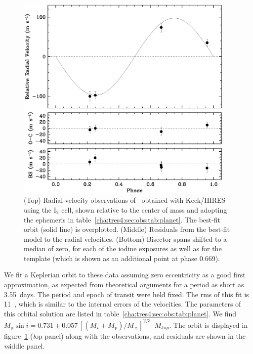 \begin{figure}
\includegraphics[width=0.95\textwidth]{A_TrES4_f2}
\caption[Keck/HIRES radial velocity observations of \tresFour]{({\textem Top}) Radial velocity observations of \tresFour\ obtained with
Keck/HIRES using the I$_2$ cell, shown relative to the center of mass and
adopting the ephemeris in table~\ref{cha:tres4:sec:obs:tab:planet}. The best-fit orbit
({\textem solid line}) is overplotted. ({\textem Middle}) Residuals from the best-fit
model to the radial velocities. ({\textem Bottom}) Bisector spans shifted to a
median of zero, for each of the iodine exposures as well as for the template
(which is shown as an additional point at phase 0.669).\label{cha:tres4:sec:obs:fig:rv}}
\end{figure}

We fit a Keplerian orbit to these data assuming zero eccentricity as a good
first approximation, as expected from theoretical arguments for a period as
short as 3.55~days. The period and epoch of transit were held fixed. The rms of
this fit is 11~\ms, which is similar to the internal errors of the velocities.
The parameters of this orbital solution are listed in table~\ref{cha:tres4:sec:obs:tab:planet}. We
find \mbox{$M_{\mathrm p} \sin i = 0.731 \pm 0.057~[(M_{\star} + M_{\mathrm p})/M_{\sun}]^{2/3}$~$M_{\mathrm Jup}$}.%
The orbit is displayed in figure~\ref{cha:tres4:sec:obs:fig:rv} ({\textit top panel}) along with the
observations, and residuals are shown in the {\textit middle panel}.

